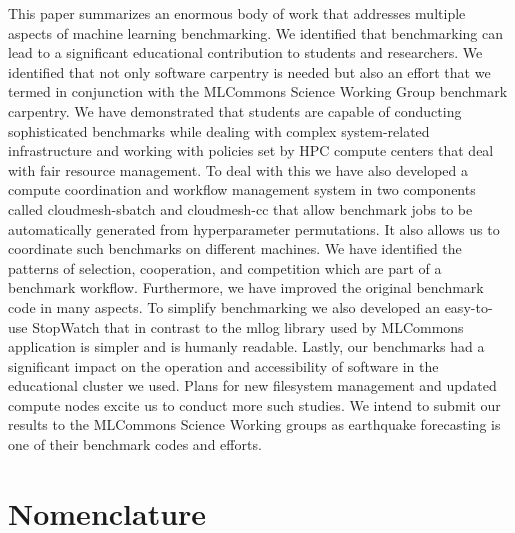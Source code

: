 \documentclass[utf8]{FrontiersinVancouver} %
\newcommand{\TODO}[1]{\todo[inline]{#1}}
\begin{document}
This paper summarizes an enormous body of work that addresses multiple
aspects of machine learning benchmarking. We identified that
benchmarking can lead to a significant educational contribution to
students and researchers. We identified that not only software
carpentry is needed but also an effort that we termed in conjunction
with the MLCommons Science Working Group benchmark carpentry. We have
demonstrated that students are capable of conducting sophisticated
benchmarks while dealing with complex system-related infrastructure
and working with policies set by HPC compute centers that deal with
fair resource management. To deal with this we have also developed a
compute coordination and workflow management system in two components
called cloudmesh-sbatch and cloudmesh-cc that allow benchmark jobs to
be automatically generated from hyperparameter permutations. It also
allows us to coordinate such benchmarks on different machines. We have
identified the patterns of selection, cooperation, and competition
which are part of a benchmark workflow. Furthermore, we have improved
the original benchmark code in many aspects. To simplify benchmarking
we also developed an easy-to-use StopWatch that in contrast to the
mllog library used by MLCommons application is simpler and is humanly
readable. Lastly, our benchmarks had a significant impact on the
operation and accessibility of software in the educational cluster we
used. Plans for new filesystem management and updated compute nodes
excite us to conduct more such studies. We intend to submit our results
to the MLCommons Science Working groups as earthquake forecasting
is one of their benchmark codes and efforts.

\clearpage

\section{Nomenclature}
\end{document}
